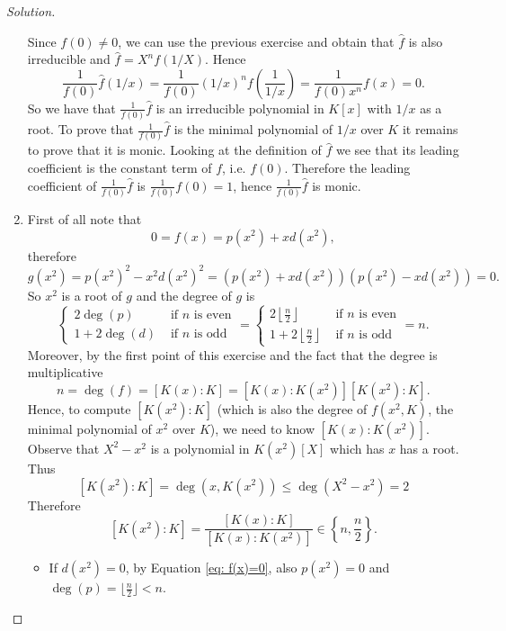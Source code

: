 \documentclass[a4paper,10pt,reqno]{amsart}
\theoremstyle{definition} %
\newenvironment{sol}
  {\renewcommand\qedsymbol{$\blacksquare$}\begin{proof}[Solution]}
  {\end{proof}}
\begin{document}
\begin{sol}
\begin{enumerate}[label=(\roman*)]
    Since $f(0)\neq 0$, we can use the previous exercise and obtain that $\widehat{f}$ is also irreducible and $\widehat{f}=X^nf(1/X)$.
    Hence
    \[
    \frac{1}{f(0)}\widehat{f}\left(1/x\right)=\frac{1}{f(0)}\left(1/x\right)^nf\left(\frac{1}{1/x}\right)=\frac{1}{f(0)x^n}f(x)=0.
    \]
    So we have that $\frac{1}{f(0)}\widehat{f}$ is an irreducible polynomial in $K[x]$ 
    with $1/x$ as a root.
    To prove that $\frac{1}{f(0)}\widehat{f}$ is 
    the minimal polynomial of $1/x$ over $K$ it remains to prove that it is monic.
    Looking at the definition of $\widehat{f}$ we see that its leading coefficient
    is the constant term of $f$, i.e. $f(0)$.
    Therefore the leading coefficient of $\frac{1}{f(0)}\widehat{f}$ is $\frac{1}{f(0)}f(0)=1$, hence $\frac{1}{f(0)}\widehat{f}$ is monic.
    \item 
    First of all note that 
    \begin{equation}
           0=f(x)=p(x^2)+xd(x^2), \label{eq: f(x)=0}
    \end{equation} therefore
    \[
    g(x^2)=p(x^2)^2-x^2d(x^2)^2=(p(x^2)+xd(x^2))(p(x^2)-xd(x^2))=0.
    \]
    So $x^2$ is a root of $g$ and the degree of $g$ is 
    \[
   \begin{cases}
        2\deg(p) &\text{ if }n\text{ is even}\\
        1+2\deg(d)&\text{ if }n\text{ is odd}
    \end{cases} =\begin{cases}
        2\left\lfloor \frac{n}{2}\right\rfloor &\text{ if }n\text{ is even}\\
        1+2\left\lfloor \frac{n}{2}\right\rfloor&\text{ if }n\text{ is odd}
    \end{cases} = n.
    \]
    Moreover, by the first point of this exercise and the fact that the degree is multiplicative
    \[
    n=\deg(f)=[K(x):K]=[K(x):K(x^2)][K(x^2):K].
    \]
    Hence, to compute $[K(x^2):K]$ (which is also the degree of $f(x^2,K)$,
    the minimal polynomial of $x^2$ over $K$), we need to know $[K(x):K(x^2)]$.
    Observe that $X^2-x^2$ is a polynomial in $K(x^2)[X]$ which has $x$ has a root. Thus 
    \[
    [K(x^2):K]=\deg(x,K(x^2))\leq \deg(X^2-x^2)=2
    \]
    Therefore 
    \begin{equation}\label{eq: deg of x^2}
        [K(x^2):K]=\frac{[K(x):K]}{[K(x):K(x^2)]}\in\left\{n,\frac{n}{2}\right\}.
    \end{equation}
    \begin{itemize}
        \item If $d(x^2)=0$, by Equation \eqref{eq: f(x)=0}, also $p(x^2)=0$ and $\deg(p)=\lfloor \frac{n}{2}\rfloor< n$.

\end{itemize}
\end{enumerate}
\end{sol}
\end{document}
